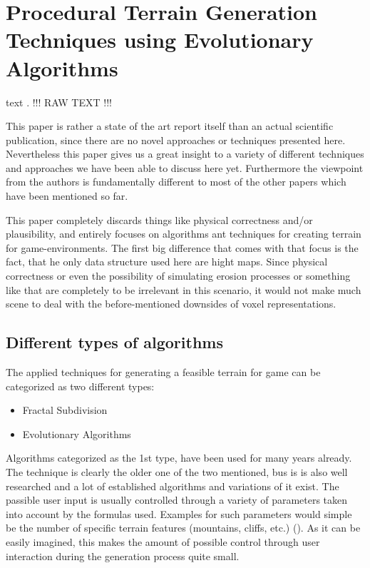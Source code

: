 \section{Procedural Terrain Generation Techniques using Evolutionary Algorithms}

text \cite{raffe2012survey}.
!!! RAW TEXT !!!

This paper is rather a state of the art report itself than an actual scientific publication, since there are no novel approaches or techniques presented here. Nevertheless this paper gives us a great insight to a variety of different techniques and approaches we have been able to discuss here yet. Furthermore the viewpoint from the authors is fundamentally different to most of the other papers which have been mentioned so far.

This paper completely discards things like physical correctness and/or plausibility, and entirely focuses on algorithms ant techniques for creating terrain for game-environments. The first big difference that comes with that focus is the fact, that he only data structure used here are hight maps. Since physical correctness or even the possibility of simulating erosion processes or something like that are completely to be irrelevant in this scenario, it would not make much scene to deal with the before-mentioned downsides of voxel representations.

\subsection{Different types of algorithms}
The applied techniques for generating a feasible terrain for game can be categorized as two different types:
\begin{itemize}
	\item Fractal Subdivision 
	\item Evolutionary Algorithms
\end{itemize}

Algorithms categorized as the 1st type, have been used for many years already. The technique is clearly the older one of the two mentioned, bus is is also well researched and a lot of established algorithms and variations of it exist. The passible user input is usually controlled through a variety of parameters taken into account by the formulas used. Examples for such parameters would simple be the number of specific terrain features (mountains, cliffs, etc.) (). As it can be easily imagined, this makes the amount of possible control through user interaction during the generation process quite small.

